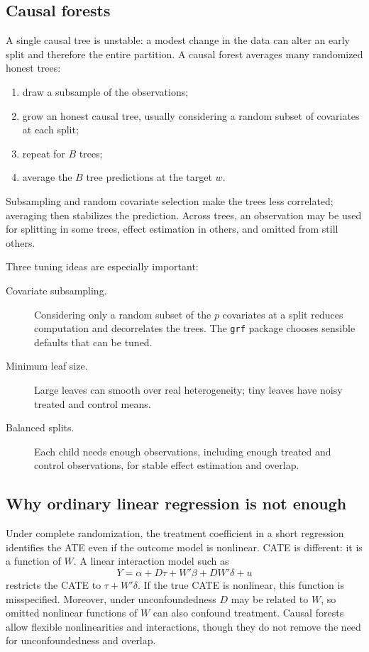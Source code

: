 \subsection{Causal forests}

A single causal tree is unstable: a modest change in the data can alter an early
split and therefore the entire partition.  A causal forest averages many randomized
honest trees:

\begin{enumerate}
  \item draw a subsample of the observations;
  \item grow an honest causal tree, usually considering a random subset of
  covariates at each split;
  \item repeat for $B$ trees;
  \item average the $B$ tree predictions at the target $w$.
\end{enumerate}

Subsampling and random covariate selection make the trees less correlated; averaging
then stabilizes the prediction.  Across trees, an observation may be used for
splitting in some trees, effect estimation in others, and omitted from still others.

Three tuning ideas are especially important:

\begin{description}
  \item[Covariate subsampling.] Considering only a random subset of the $p$
  covariates at a split reduces computation and decorrelates the trees.  The
  \texttt{grf} package chooses sensible defaults that can be tuned.
  \item[Minimum leaf size.] Large leaves can smooth over real heterogeneity; tiny
  leaves have noisy treated and control means.
  \item[Balanced splits.] Each child needs enough observations, including enough
  treated and control observations, for stable effect estimation and overlap.
\end{description}

\subsection{Why ordinary linear regression is not enough}

Under complete randomization, the treatment coefficient in a short regression
identifies the ATE even if the outcome model is nonlinear.  CATE is different: it is
a function of $W$.  A linear interaction model such as
\[
  Y=\alpha+D\tau+W'\beta+D W'\delta+u
\]
restricts the CATE to $\tau+W'\delta$.  If the true CATE is nonlinear, this function
is misspecified.  Moreover, under unconfoundedness $D$ may be related to $W$, so
omitted nonlinear functions of $W$ can also confound treatment.  Causal forests
allow flexible nonlinearities and interactions, though they do not remove the need
for unconfoundedness and overlap.


